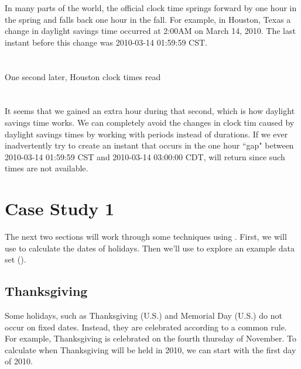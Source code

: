 \documentclass[article]{jss}
\begin{document}
In many parts of the world, the official clock time springs forward by one hour in the spring and falls back one hour in the fall. For example, in Houston, Texas a change in daylight savings time occurred at 2:00AM on March 14, 2010. The last instant before this change was 2010-03-14 01:59:59 CST.\\

\\
\\

One second later, Houston clock times read\\

\\
\\

It seems that we gained an extra hour during that second, which is how daylight savings time works. We can completely avoid the changes in clock tim caused by daylight savings times by working with periods instead of durations. If we ever inadvertently try to create an instant that occurs in the one hour ``gap" between 2010-03-14 01:59:59 CST  and 2010-03-14 03:00:00 CDT,  will return  since such times are not available.

\section{Case Study 1}

The next two sections will work through some techniques using . First, we will use  to calculate the dates of  holidays. Then we'll use  to explore an example data set ().

\subsection{Thanksgiving}
Some holidays, such as Thanksgiving (U.S.) and Memorial Day (U.S.) do not occur on fixed dates. Instead, they are celebrated according to a common rule. For example, Thanksgiving is celebrated on the fourth thursday of November. To calculate when Thanksgiving will be held in 2010, we can start with the first day of 2010.\\

\\
\\
\end{document}

